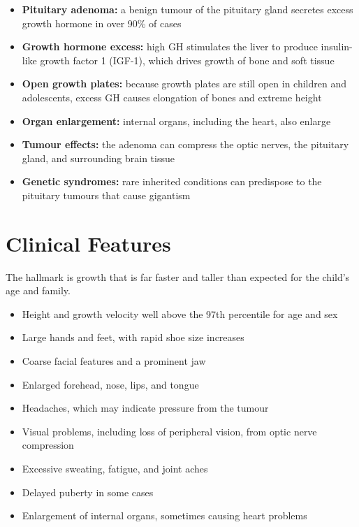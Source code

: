 \begin{itemize}
    \item \textbf{Pituitary adenoma:} a benign tumour of the pituitary gland secretes excess growth hormone in over 90\% of cases
    \item \textbf{Growth hormone excess:} high GH stimulates the liver to produce insulin-like growth factor 1 (IGF-1), which drives growth of bone and soft tissue
    \item \textbf{Open growth plates:} because growth plates are still open in children and adolescents, excess GH causes elongation of bones and extreme height
    \item \textbf{Organ enlargement:} internal organs, including the heart, also enlarge
    \item \textbf{Tumour effects:} the adenoma can compress the optic nerves, the pituitary gland, and surrounding brain tissue
    \item \textbf{Genetic syndromes:} rare inherited conditions can predispose to the pituitary tumours that cause gigantism
\end{itemize}

\section*{Clinical Features}
The hallmark is growth that is far faster and taller than expected for the child's age and family.

\begin{itemize}
    \item Height and growth velocity well above the 97th percentile for age and sex
    \item Large hands and feet, with rapid shoe size increases
    \item Coarse facial features and a prominent jaw
    \item Enlarged forehead, nose, lips, and tongue
    \item Headaches, which may indicate pressure from the tumour
    \item Visual problems, including loss of peripheral vision, from optic nerve compression
    \item Excessive sweating, fatigue, and joint aches
    \item Delayed puberty in some cases
    \item Enlargement of internal organs, sometimes causing heart problems
\end{itemize}

